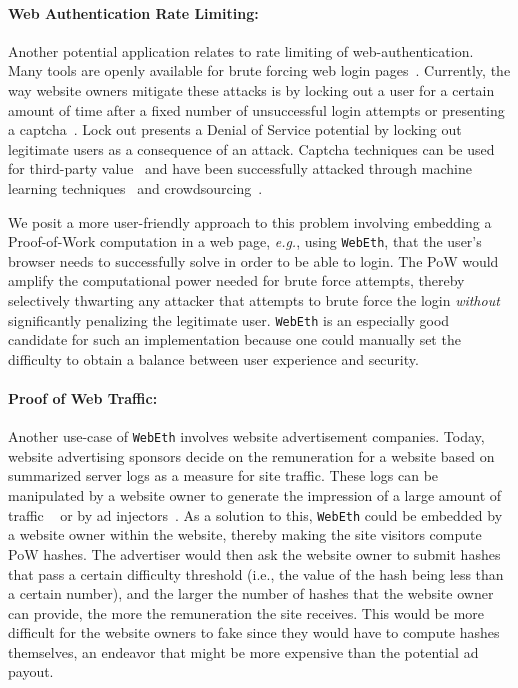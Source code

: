 \documentclass[runningheads]{llncs}
\begin{document}
\paragraph{Web Authentication Rate Limiting:}
Another potential application relates to rate limiting of web-authentication. Many tools are openly available for brute forcing web login pages~\cite{hydra,burpsuite}. Currently, the way website owners mitigate these attacks is by locking out a user for a certain amount of time after a fixed number of unsuccessful login attempts or presenting a captcha~\cite{recaptcha}.  
Lock out presents a Denial of Service potential by locking out legitimate users as a consequence of an attack. 
Captcha techniques can be used for third-party value~\cite{von2008recaptcha} and have been successfully attacked through machine learning techniques~\cite{mlCaptcha} and crowdsourcing~\cite{captchaFarms}. 
   
We posit a more user-friendly approach to this problem involving embedding a Proof-of-Work computation in a web page, \emph{e.g.}, using \verb|WebEth|, that the user's browser needs to successfully solve in order to be able to login. The PoW would amplify the computational power needed for brute force attempts, thereby selectively thwarting any attacker that attempts to brute force the login \emph{without} significantly penalizing the legitimate user. \verb|WebEth| is an especially good candidate for such an implementation because one could manually set the difficulty to obtain a balance between user experience and security.

\paragraph{Proof of Web Traffic:}
Another use-case of \verb|WebEth| involves website advertisement companies. Today, website advertising sponsors decide on the remuneration for a website based on summarized server logs as a measure for site traffic. These logs can be manipulated by a website owner to generate the impression of a large amount of traffic ~\cite{webLogsManipulation} or by ad injectors~\cite{adinjection}. As a solution to this, \verb|WebEth| could be embedded by a website owner within the website, thereby making the site visitors compute PoW hashes. The advertiser would then ask the website owner to submit hashes that pass a certain difficulty threshold (i.e., the value of the hash being less than a certain number), and the larger the number of hashes that the website owner can provide, the more the remuneration the site receives. This would be more difficult for the website owners to fake since they would have to compute hashes themselves, an endeavor that might be more expensive than the potential ad payout.
\end{document}
